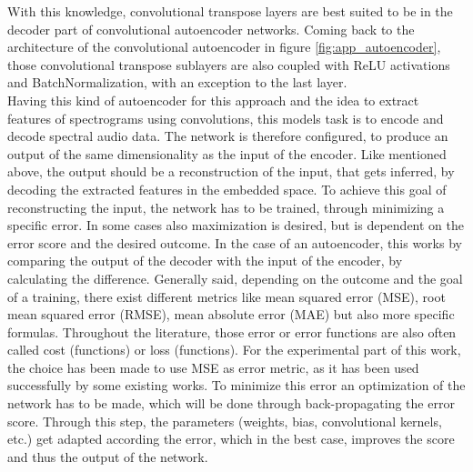 With this knowledge, convolutional transpose layers are best suited to be in the decoder part of convolutional autoencoder networks. Coming back to the architecture of the convolutional autoencoder in figure \ref{fig:app_autoencoder}, those convolutional transpose sublayers are also coupled with ReLU activations and BatchNormalization, with an exception to the last layer.\\

Having this kind of autoencoder for this approach and the idea to extract features of spectrograms using convolutions, this models task is to encode and decode spectral audio data. The network is therefore configured, to produce an output of the same dimensionality as the input of the encoder. Like mentioned above, the output should be a reconstruction of the input, that gets inferred, by decoding the extracted features in the embedded space. To achieve this goal of reconstructing the input, the network has to be trained, through minimizing a specific error. In some cases also maximization is desired, but is dependent on the error score and the desired outcome. In the case of an autoencoder, this works by comparing the output of the decoder with the input of the encoder, by calculating the difference. Generally said, depending on the outcome and the goal of a training, there exist different metrics like mean squared error (MSE), root mean squared error (RMSE), mean absolute error (MAE) but also more specific formulas. Throughout the literature, those error or error functions are also often called cost (functions) or loss (functions). For the experimental part of this work, the choice has been made to use MSE as error metric, as it has been used successfully by some existing works. 
To minimize this error an optimization of the network has to be made, which will be done through back-propagating the error score. Through this step, the parameters (weights, bias, convolutional kernels, etc.) get adapted according the error, which in the best case, improves the score and thus the output of the network.\\


